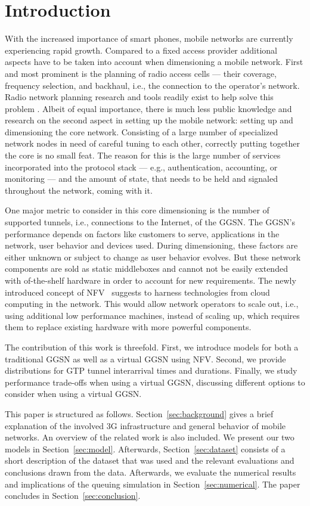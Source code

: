 \section{Introduction}
\label{sec:intro}
With the increased importance of smart phones, mobile networks are currently experiencing rapid growth.
Compared to a fixed access provider additional aspects have to be taken into account when dimensioning a mobile network. 
First and most prominent is the planning of radio access cells --- their coverage, frequency selection, and backhaul, i.e., the connection to the operator's network. Radio network planning research and tools readily exist to help solve this problem \cite{tutschku1998demand}.
Albeit of equal importance, there is much less public knowledge and research on the second aspect in setting up the mobile network: setting up and dimensioning the core network. Consisting of a large number of specialized network nodes in need of careful tuning to each other, correctly putting together the core is no small feat. The reason for this is the large number of services incorporated into the protocol stack --- e.g., authentication, accounting, or monitoring --- and the amount of state, that needs to be held and signaled throughout the network, coming with it.

One major metric to consider in this core dimensioning is the number of supported tunnels, i.e., connections to the Internet, of the \gls{GGSN}.
The \gls{GGSN}'s performance depends on factors like customers to serve, applications in the network, user behavior and devices used. During dimensioning, these factors are either unknown or subject to change as user behavior evolves.
But these network components are sold as static middleboxes and cannot not be easily extended with of-the-shelf hardware in order to account for new requirements.
The newly introduced concept of \gls{NFV}~\cite{nfv_whitepaper} suggests to harness technologies from cloud computing in the network. This would allow network operators to scale out, i.e., using additional low performance machines, instead of scaling up, which requires them to replace existing hardware with more powerful components.

The contribution of this work is threefold. First, we introduce models for both a traditional \gls{GGSN} as well as a virtual \gls{GGSN} using \gls{NFV}. Second, we provide distributions for \gls{GTP} tunnel interarrival times and durations. Finally, we study performance trade-offs when using a virtual \gls{GGSN}, discussing different options to consider when using a virtual \gls{GGSN}.

This paper is structured as follows. Section~\ref{sec:background} gives a brief explanation of the involved 3G infrastructure and general behavior of mobile networks. An overview of the related work is also included. We present our two models in Section~\ref{sec:model}. Afterwards, Section~\ref{sec:dataset} consists of a short description of the dataset that was used and the relevant evaluations and conclusions drawn from the data. Afterwards, we evaluate the numerical results and implications of the queuing simulation in Section~\ref{sec:numerical}. The paper concludes in Section~\ref{sec:conclusion}.
